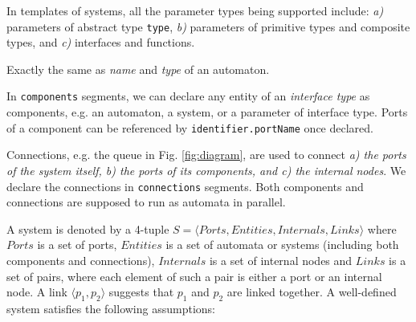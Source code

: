  In templates of systems, all the parameter types being supported include: \emph{a)} parameters of abstract type \texttt{type}, \emph{b)} parameters of primitive types and composite types, and \emph{c)} interfaces and functions.

 Exactly the same as \emph{name} and \emph{type} of an automaton.

 In \texttt{components} segments, we can declare any entity of an \emph{interface type} as components, e.g. an automaton, a system, or a parameter of interface type. 
Ports of a component can be referenced by \texttt{identifier.portName} once declared.

 Connections, e.g. the queue in Fig. \ref{fig:diagram}, are used to connect \emph{a) the ports of the system itself, b) the ports of its components, and c) the internal nodes}. We declare the connections in \texttt{connections} segments.
Both components and connections are supposed to run as automata in parallel.

 



A system is denoted by a 4-tuple
$S=\langle Ports, Entities, Internals, Links\rangle$ where $Ports$ is a set of ports, $Entities$ is a set of automata or systems (including both components and connections), $Internals$ is a set of internal nodes and $Links$ is a set of pairs, where each element of such a pair is either a port or an internal node. A link $\langle p_1,p_2\rangle$ suggests that $p_1$ and $p_2$ are linked together. A well-defined system satisfies the following assumptions:

